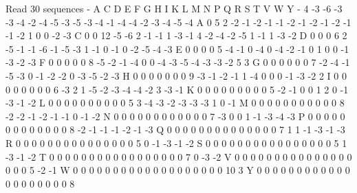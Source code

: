 Read 30 sequences
 	 -	 A	 C	 D	 E	 F	 G	 H	 I	 K	 L	 M	 N	 P	 Q	 R	 S	 T	 V	 W	 Y
-	 4	 -3	 -6	 -3	 -3	 -4	 -2	 -4	 -5	 -3	 -5	 -3	 -4	 -1	 -4	 -4	 -2	 -3	 -4	 -5	 -4
A	 0	 5	 2	 -2	 -1	 -2	 -1	 -1	 -2	 -1	 -2	 -1	 -2	 -1	 -1	 -2	 1	 0	 0	 -2	 -3
C	 0	 0	 12	 -5	 -6	 2	 -1	 -1	 1	 -3	 -1	 4	 -2	 -4	 -2	 -5	 1	 -1	 1	 -3	 -2
D	 0	 0	 0	 6	 2	 -5	 -1	 -1	 -6	 -1	 -5	 -3	 1	 -1	 0	 -1	 0	 -2	 -5	 -4	 -3
E	 0	 0	 0	 0	 5	 -4	 -1	 0	 -4	 0	 -4	 -2	 -1	 0	 1	 0	 0	 -1	 -3	 -2	 -3
F	 0	 0	 0	 0	 0	 8	 -5	 -2	 -1	 -4	 0	 0	 -4	 -3	 -5	 -4	 -3	 -3	 -2	 5	 3
G	 0	 0	 0	 0	 0	 0	 7	 -2	 -4	 -1	 -5	 -3	 0	 -1	 -2	 -2	 0	 -3	 -5	 -2	 -3
H	 0	 0	 0	 0	 0	 0	 0	 9	 -3	 -1	 -2	 -1	 1	 -4	 0	 0	 0	 -1	 -3	 -2	 2
I	 0	 0	 0	 0	 0	 0	 0	 0	 6	 -3	 2	 1	 -5	 -2	 -3	 -4	 -4	 -2	 3	 -3	 -1
K	 0	 0	 0	 0	 0	 0	 0	 0	 0	 5	 -2	 -1	 0	 0	 1	 2	 0	 -1	 -3	 -1	 -2
L	 0	 0	 0	 0	 0	 0	 0	 0	 0	 0	 5	 3	 -4	 -3	 -2	 -3	 -3	 -3	 1	 0	 -1
M	 0	 0	 0	 0	 0	 0	 0	 0	 0	 0	 0	 8	 -2	 -2	 -1	 -2	 -1	 -1	 0	 -1	 -2
N	 0	 0	 0	 0	 0	 0	 0	 0	 0	 0	 0	 0	 7	 -3	 0	 0	 1	 -1	 -3	 -4	 -3
P	 0	 0	 0	 0	 0	 0	 0	 0	 0	 0	 0	 0	 0	 8	 -2	 -1	 -1	 -1	 -2	 -1	 -3
Q	 0	 0	 0	 0	 0	 0	 0	 0	 0	 0	 0	 0	 0	 0	 7	 1	 1	 -1	 -3	 -1	 -3
R	 0	 0	 0	 0	 0	 0	 0	 0	 0	 0	 0	 0	 0	 0	 0	 5	 0	 -1	 -3	 -1	 -2
S	 0	 0	 0	 0	 0	 0	 0	 0	 0	 0	 0	 0	 0	 0	 0	 0	 5	 1	 -3	 -1	 -2
T	 0	 0	 0	 0	 0	 0	 0	 0	 0	 0	 0	 0	 0	 0	 0	 0	 0	 7	 0	 -3	 -2
V	 0	 0	 0	 0	 0	 0	 0	 0	 0	 0	 0	 0	 0	 0	 0	 0	 0	 0	 5	 -2	 -1
W	 0	 0	 0	 0	 0	 0	 0	 0	 0	 0	 0	 0	 0	 0	 0	 0	 0	 0	 0	 10	 3
Y	 0	 0	 0	 0	 0	 0	 0	 0	 0	 0	 0	 0	 0	 0	 0	 0	 0	 0	 0	 0	 8
